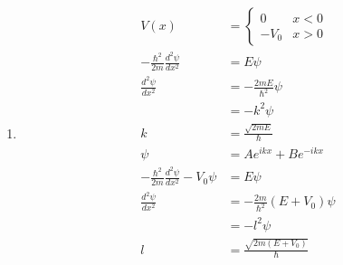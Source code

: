 \documentclass{article}
\begin{document}
\subsection{}

\begin{enumerate}
  \item

        \begin{align*}
          V(x)                                                   & = \begin{cases}
                                                                       0    & x < 0 \\
                                                                       -V_0 & x > 0
                                                                     \end{cases}                                                                 \\
          -\frac{\hbar^2}{2 m} \frac{d^2 \psi}{d x^2}            & = E \psi                                                                       \\
          \frac{d^2 \psi}{d x^2}                                 & = -\frac{2 m E}{\hbar^2} \psi                                                  \\
                                                                 & = -k^2 \psi                                                                    \\
          k                                                      & = \frac{\sqrt{2 m E}}{\hbar}                                                   \\
          \psi                                                   & = A e^{i k x} + B e^{-i k x}                                                   \\
          -\frac{\hbar^2}{2 m} \frac{d^2 \psi}{d x^2} - V_0 \psi & = E \psi                                                                       \\
          \frac{d^2 \psi}{d x^2}                                 & = -\frac{2 m}{\hbar^2} (E + V_0) \psi                                          \\
                                                                 & = -l^2 \psi                                                                    \\
          l                                                      & = \frac{\sqrt{2 m (E + V_0)}}{\hbar}                                           \\

\end{align*}
\end{enumerate}
\end{document}
